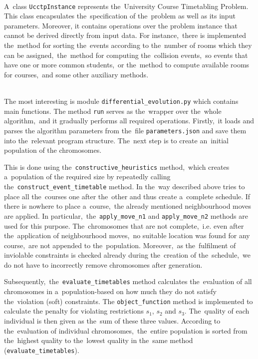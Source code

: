 \noindent\\
A~class \texttt{UcctpInstance} represents the~University Course Timetabling Problem.
This class encapsulates the~specification of the~problem as well as its input parameters.
Moreover, it contains operations over the problem instance that cannot be derived directly from input data.
For instance,~there is implemented the~method for sorting the~events according to the~number of rooms which they can be assigned,~the~method for computing the~collision events,~so events that have one or more common students,~or the~method to compute available rooms for courses,~and some other auxiliary methods.

\noindent\\
The most interesting is module \texttt{differential\_e\-volution.py} which contains main functions.
The method \texttt{run} serves as the~wrapper over the~whole algorithm,~and it gradually performs all required operations.
Firstly,~it loads and parses the algorithm parameters from the~file \texttt{parameters.json} and save them into the~relevant program structure.
The~next step is to create an~initial population of the chromosomes. 

This is done using the~\texttt{constructive\_heuri\-stics} method,~which creates a~population of the required size by repeatedly calling the~\texttt{construct\_e\-vent\_time\-table} method.
In the~way described above tries to place all the~courses one after the~other and thus create a~complete schedule. 
If there is nowhere to place a~course,~the already mentioned neighbourhood moves are applied. 
In particular,~the~\texttt{apply\_mo\-ve\_n1} and \texttt{apply\_move\_n2} methods are used for this purpose.
The~chromosomes that are not complete,~i.e. even after the~application of neighbourhood moves,~no suitable location was found for any course,~are not appended to the~population.
Moreover,~as the~fulfilment of inviolable constraints is che\-cked already during the~creation of the~schedule,~we do not have to incorrectly remove chromosomes after generation.

Subsequently,~the~\texttt{evaluate\_timetables} me\-thod calculates the~evaluation of all chromosomes in a~population-based on how much they do not satisfy the~violation (soft) constraints. 
The \texttt{object\_func\-tion} method is implemented to calculate the penalty for violating restrictions $s_1$, $s_2$ and $s_3$.
The~quality of each individual is then given as the~sum of these three values. 
According to the~evaluation of individual chromosomes,~the~entire population is sorted from the~highest quality to the~lowest quality in the~same method (\texttt{evaluate\_timetables}).

